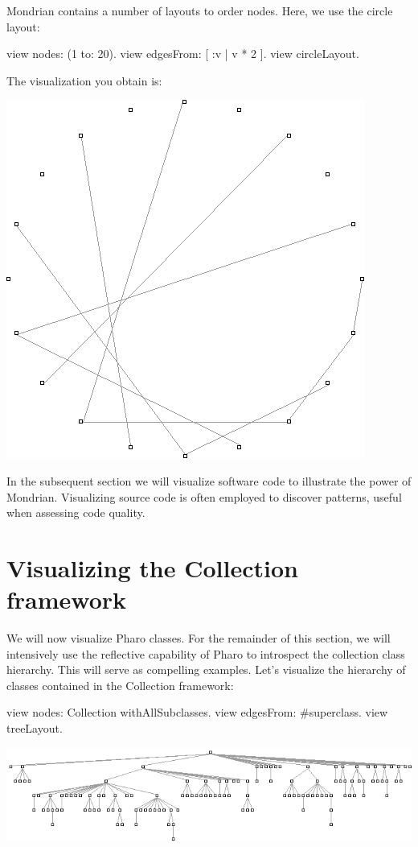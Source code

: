 \documentclass[a4paper,10pt,twoside]{book}
\begin{document}
Mondrian contains a number of layouts to order nodes. Here, we use the circle layout:

\begin{code}{}
view nodes: (1 to: 20).
view edgesFrom: [ :v | v * 2 ].
view circleLayout.
\end{code}

The visualization you obtain is:

\begin{center}\includegraphics[scale=0.4]{picture3}\end{center}

In the subsequent section we will visualize software code to illustrate the power of Mondrian. Visualizing source code is often employed to discover patterns, useful when assessing code quality.


\section{Visualizing the Collection framework}

We will now visualize Pharo classes. For the remainder of this section, we will intensively use the reflective capability of Pharo to introspect the collection class hierarchy. This will serve as compelling examples. Let's visualize the hierarchy of classes contained in the Collection framework:

\begin{code}{}
view nodes: Collection withAllSubclasses.
view edgesFrom: #superclass.
view treeLayout.
\end{code}
\begin{center}\includegraphics[scale=0.4]{picture4}\end{center}
\end{document}
